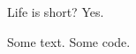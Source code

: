 \documentclass[fleqn]{article}
\begin{document}
\begin{fact}{Life is short?}{}
    Yes.
\end{fact}

\begin{exec}
    Some text.
\tcblower
    Some code.
\end{exec}
\end{document}
